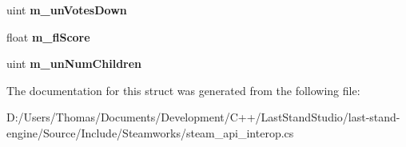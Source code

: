 \begin{DoxyCompactItemize}
\item 
\hypertarget{structValve_1_1Steamworks_1_1SteamUGCDetails__t_a68f0a9fb4205b95129cf047346540395}{}uint {\bfseries m\+\_\+un\+Votes\+Down}\label{structValve_1_1Steamworks_1_1SteamUGCDetails__t_a68f0a9fb4205b95129cf047346540395}

\item 
\hypertarget{structValve_1_1Steamworks_1_1SteamUGCDetails__t_aeb08247acf765464beff5bc41ff29128}{}float {\bfseries m\+\_\+fl\+Score}\label{structValve_1_1Steamworks_1_1SteamUGCDetails__t_aeb08247acf765464beff5bc41ff29128}

\item 
\hypertarget{structValve_1_1Steamworks_1_1SteamUGCDetails__t_a3b3c42b67659cea383f7b21c9c7442af}{}uint {\bfseries m\+\_\+un\+Num\+Children}\label{structValve_1_1Steamworks_1_1SteamUGCDetails__t_a3b3c42b67659cea383f7b21c9c7442af}

\end{DoxyCompactItemize}


The documentation for this struct was generated from the following file\+:\begin{DoxyCompactItemize}
\item 
D\+:/\+Users/\+Thomas/\+Documents/\+Development/\+C++/\+Last\+Stand\+Studio/last-\/stand-\/engine/\+Source/\+Include/\+Steamworks/steam\+\_\+api\+\_\+interop.\+cs\end{DoxyCompactItemize}
